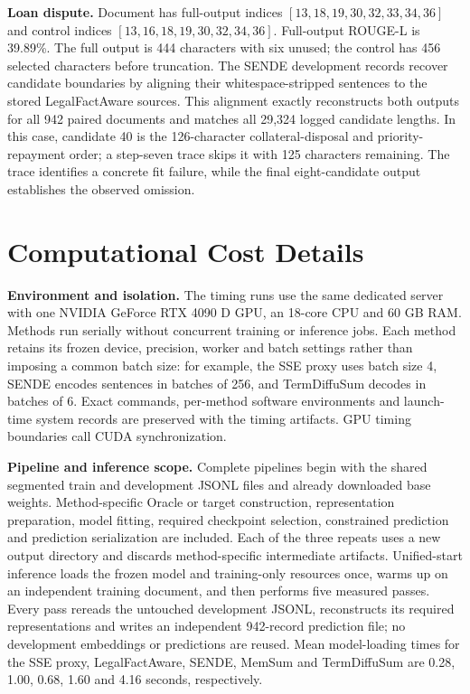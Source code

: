 \documentclass[10pt,twocolumn,letterpaper]{article}
\begin{document}
\textbf{Loan dispute.} Document  has full-output indices $[13,18,19,30,32,33,34,36]$ and control indices $[13,16,18,19,30,32,34,36]$. Full-output ROUGE-L is 39.89\%. The full output is 444 characters with six unused; the control has 456 selected characters before truncation. The SENDE development records recover candidate boundaries by aligning their whitespace-stripped sentences to the stored LegalFactAware sources. This alignment exactly reconstructs both outputs for all 942 paired documents and matches all 29,324 logged candidate lengths. In this case, candidate 40 is the 126-character collateral-disposal and priority-repayment order; a step-seven trace skips it with 125 characters remaining. The trace identifies a concrete fit failure, while the final eight-candidate output establishes the observed omission.

\section{Computational Cost Details}\label{appendix-j-computational-cost}
\textbf{Environment and isolation.} The timing runs use the same dedicated server with one NVIDIA GeForce RTX 4090 D GPU, an 18-core CPU and 60 GB RAM. Methods run serially without concurrent training or inference jobs. Each method retains its frozen device, precision, worker and batch settings rather than imposing a common batch size: for example, the SSE proxy uses batch size 4, SENDE encodes sentences in batches of 256, and TermDiffuSum decodes in batches of 6. Exact commands, per-method software environments and launch-time system records are preserved with the timing artifacts. GPU timing boundaries call CUDA synchronization.

\textbf{Pipeline and inference scope.} Complete pipelines begin with the shared segmented train and development JSONL files and already downloaded base weights. Method-specific Oracle or target construction, representation preparation, model fitting, required checkpoint selection, constrained prediction and prediction serialization are included. Each of the three repeats uses a new output directory and discards method-specific intermediate artifacts. Unified-start inference loads the frozen model and training-only resources once, warms up on an independent training document, and then performs five measured passes. Every pass rereads the untouched development JSONL, reconstructs its required representations and writes an independent 942-record prediction file; no development embeddings or predictions are reused. Mean model-loading times for the SSE proxy, LegalFactAware, SENDE, MemSum and TermDiffuSum are 0.28, 1.00, 0.68, 1.60 and 4.16 seconds, respectively.
\end{document}
